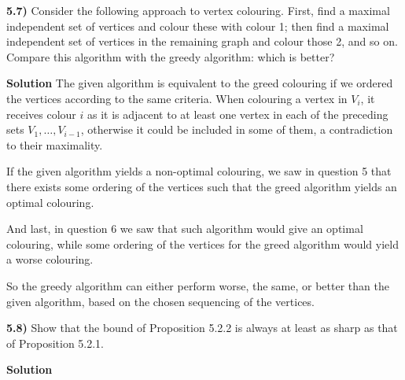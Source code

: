 \documentclass[11pt]{article}
\theoremstyle{plain}
\begin{document}
\textbf{5.7)} Consider the following approach to vertex colouring. First, find a maximal independent set of vertices and colour these with colour 1; then find a maximal independent set of vertices in the remaining graph and colour those 2, and so on. Compare this algorithm with the greedy algorithm: which is better?

\vspace{.4cm}
\noindent \textbf{Solution} 
The given algorithm is equivalent to the greed colouring if we ordered the vertices according to the same criteria. When colouring a vertex in $V_i$, it receives colour $i$ as it is adjacent to at least one vertex in each of the preceding sets $V_1,\ldots,V_{i-1}$, otherwise it could be included in some of them, a contradiction to their maximality.

If the given algorithm yields a non-optimal colouring, we saw in question 5 that there exists some ordering of the vertices such that the greed algorithm yields an optimal colouring.

And last, in question 6 we saw that such algorithm would give an optimal colouring, while some ordering of the vertices for the greed algorithm would yield a worse colouring.

So the greedy algorithm can either perform worse, the same, or better than the given algorithm, based on the chosen sequencing of the vertices.

\vspace{.4cm}
\textbf{5.8)} Show that the bound of Proposition 5.2.2 is always at least as sharp as that of Proposition 5.2.1.

\vspace{.4cm}
\noindent \textbf{Solution} 
\end{document}
